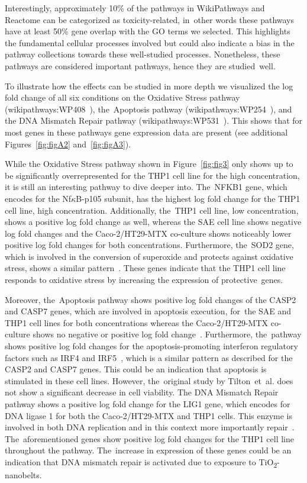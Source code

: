 \documentclass[ijms,article,accept,moreauthors,pdftex]{Definitions/mdpi}
\begin{document}
\begin{paracol}{2}
Interestingly, approximately 10\% of the pathways in WikiPathways and Reactome can be categorized as toxicity-related, in~other words these pathways have at least 50\% gene overlap with the GO terms we selected. This highlights the fundamental cellular processes involved but could also indicate a bias in the pathway collections towards these well-studied processes. Nonetheless, these pathways are considered important pathways, hence they are studied~well.  

To illustrate how the effects can be studied in more depth we visualized the log fold change of all six conditions on the Oxidative Stress pathway (wikipathways:WP408~\cite{WP408}), the~Apoptosis pathway (wikipathways:WP254~\cite{WP254}), and the DNA Mismatch Repair pathway (wikipathways:WP531~\cite{WP531}). This shows that for most genes in these pathways gene expression data are present (see additional Figures~\ref{fig:figA2} and~\ref{fig:figA3}). 

While the Oxidative Stress pathway shown in Figure~\ref{fig:fig3} only shows up to be significantly overrepresented for the THP1 cell line for the high concentration, it is still an interesting pathway to dive deeper into. The~NFKB1 gene, which encodes for the Nf$\kappa$B-p105 subunit, has the highest log fold change for the THP1 cell line, high concentration. Additionally, the~THP1 cell line, low concentration, shows a positive log fold change as well, whereas the SAE cell line shows negative log fold changes and the {Caco-2/HT29-MTX co-culture} shows noticeably lower positive log fold changes for both concentrations. Furthermore, the~SOD2 gene, which is involved in the conversion of superoxide and protects against oxidative stress, shows a similar pattern~\cite{Urso2003}. These genes indicate that the THP1 cell line responds to oxidative stress by increasing the expression of protective~genes. 


Moreover, the~Apoptosis pathway shows positive log fold changes of the CASP2 and CASP7 genes, which are involved in apoptosis execution, for~the SAE and THP1 cell lines for both concentrations whereas the {Caco-2/HT29-MTX co-culture} shows no negative or positive log fold change~\cite{BouchierHayes2011,Lamkanfi2010}. Furthermore, the~pathway shows positive log fold changes for the apoptosis-promoting interferon regulatory factors such as IRF4 and IRF5~\cite{Stang2007,Fanzo2003,Hu2009}, which is a similar pattern as described for the CASP2 and CASP7 genes. This could be an indication that apoptosis is stimulated in these cell lines. However, the~original study by Tilton~et~al. does not show a significant decrease in cell viability. 
The DNA Mismatch Repair pathway shows a positive log fold change {for the LIG1 gene}, which encodes for DNA ligase 1 {for both the Caco-2/HT29-MTX and THP1 cells}. This enzyme is involved in both DNA replication and in this context more importantly repair~\cite{Mota2019}. The~aforementioned genes show positive log fold changes for the THP1 cell line throughout the pathway. The~increase in expression of these genes could be an indication that DNA mismatch repair is activated due to exposure to TiO\textsubscript{2}-nanobelts.


\end{paracol}
\end{document}
